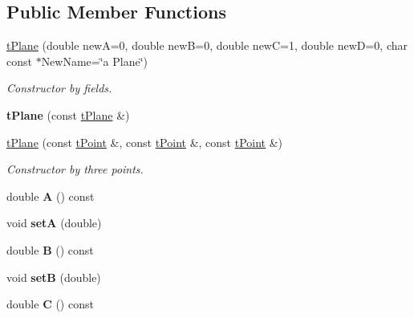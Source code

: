 \subsection*{Public Member Functions}
\begin{DoxyCompactItemize}
\item 
\mbox{\label{classtPlane_a82b8ca291bcb680731ea06067267bfe3}} 
\hyperlink{classtPlane_a82b8ca291bcb680731ea06067267bfe3}{t\+Plane} (double newA=0, double newB=0, double newC=1, double newD=0, char const $\ast$New\+Name=\char`\"{}a Plane\char`\"{})
\begin{DoxyCompactList}\small\item\em Constructor by fields. \end{DoxyCompactList}\item 
\mbox{\label{classtPlane_a18e2a0d542a83f8f250b70b9bda9c9c9}} 
{\bfseries t\+Plane} (const \hyperlink{classtPlane}{t\+Plane} \&)
\item 
\mbox{\label{classtPlane_a7232f7e46cd8e8ae4dfec128dd277b1f}} 
\hyperlink{classtPlane_a7232f7e46cd8e8ae4dfec128dd277b1f}{t\+Plane} (const \hyperlink{classtPoint}{t\+Point} \&, const \hyperlink{classtPoint}{t\+Point} \&, const \hyperlink{classtPoint}{t\+Point} \&)
\begin{DoxyCompactList}\small\item\em Constructor by three points. \end{DoxyCompactList}\item 
\mbox{\label{classtPlane_a4ddac807c5347da56a1300b7fb7b577f}} 
double {\bfseries A} () const
\item 
\mbox{\label{classtPlane_a60ebb124c3ff083af76de458971844a6}} 
void {\bfseries setA} (double)
\item 
\mbox{\label{classtPlane_abf7d8f068035f46ca31c5da6566e7732}} 
double {\bfseries B} () const
\item 
\mbox{\label{classtPlane_ae6241f12630da93be209c38e1472119e}} 
void {\bfseries setB} (double)
\item 
\mbox{\label{classtPlane_ac2a72791a7336b7c56afe1f5d396c52b}} 
double {\bfseries C} () const

\end{DoxyCompactItemize}
